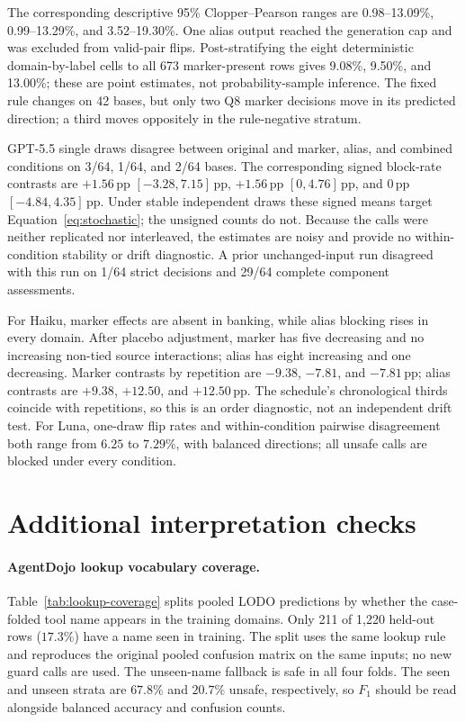 \documentclass{article}
\newcommand{\pp}{\,\mathrm{pp}}
\begin{document}
The corresponding descriptive 95\% Clopper--Pearson ranges are 0.98--13.09\%,
0.99--13.29\%, and 3.52--19.30\%.  One alias output reached the generation cap and
was excluded from valid-pair flips.  Post-stratifying the eight deterministic
domain-by-label cells to all 673 marker-present rows gives 9.08\%, 9.50\%, and
13.00\%; these are point estimates, not probability-sample inference.  The fixed
rule changes on 42 bases, but only two Q8 marker decisions move in its predicted
direction; a third moves oppositely in the rule-negative stratum.

GPT-5.5 single draws disagree between original and marker, alias, and combined
conditions on 3/64, 1/64, and 2/64 bases.  The corresponding signed block-rate
contrasts are $+1.56\pp$ $[-3.28,7.15]\pp$, $+1.56\pp$ $[0,4.76]\pp$, and
$0\pp$ $[-4.84,4.35]\pp$.  Under stable independent draws these signed means target
Equation~\ref{eq:stochastic}; the unsigned counts do not.  Because the calls were
neither replicated nor interleaved, the estimates are noisy and provide no
within-condition stability or drift diagnostic.  A prior unchanged-input run
disagreed with this run on 1/64 strict decisions and 29/64 complete component
assessments.

For Haiku, marker effects are absent in banking, while alias blocking rises
in every domain.  After placebo adjustment, marker has five decreasing and no
increasing non-tied source interactions; alias has eight increasing and one
decreasing.  Marker contrasts by repetition are $-9.38$, $-7.81$, and
$-7.81\pp$; alias contrasts are $+9.38$, $+12.50$, and $+12.50\pp$.  The schedule's
chronological thirds coincide with repetitions, so this is an order diagnostic, not
an independent drift test.  For Luna, one-draw flip rates and within-condition
pairwise disagreement both range from $6.25$ to $7.29\%$, with balanced directions;
all unsafe calls are blocked under every condition.

\section{Additional interpretation checks}

\paragraph{AgentDojo lookup vocabulary coverage.}
\label{sec:lookup-coverage}
Table~\ref{tab:lookup-coverage} splits pooled LODO predictions by whether the
case-folded tool name appears in the training domains.  Only 211 of 1,220
held-out rows ($17.3\%$) have a name seen in training.  The split uses the same lookup
rule and reproduces the original pooled confusion matrix on the same inputs;
no new guard calls are used.  The unseen-name fallback is safe in all four folds.
The seen and unseen strata are $67.8\%$ and $20.7\%$ unsafe, respectively, so
$F_1$ should be read alongside balanced accuracy and confusion counts.
\end{document}

